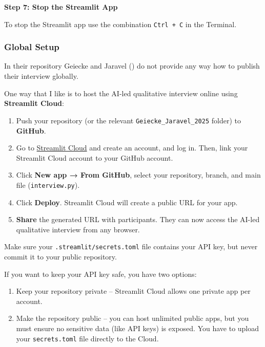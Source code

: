 \documentclass[
  letterpaper,
  DIV=11,
  numbers=noendperiod]{scrartcl}
\begin{document}
\textbf{Step 7: Stop the Streamlit App}

To stop the Streamlit app use the combination \texttt{Ctrl\ +\ C} in the
Terminal.

\subsubsection{Global Setup}\label{sec-replication-geiecke-global}

In their repository Geiecke and Jaravel
() do not provide any way how
to publish their interview globally.

One way that I like is to host the AI-led qualitative interview online
using \textbf{Streamlit Cloud}:

\begin{enumerate}
\def\labelenumi{\arabic{enumi}.}
\item
  Push your repository (or the relevant \texttt{Geiecke\_Jaravel\_2025}
  folder) to \textbf{GitHub}.
\item
  Go to \href{https://streamlit.io/cloud}{Streamlit Cloud} and create an
  account, and log in. Then, link your Streamlit Cloud account to your
  GitHub account.
\item
  Click \textbf{New app → From GitHub}, select your repository, branch,
  and main file (\texttt{interview.py}).
\item
  Click \textbf{Deploy}. Streamlit Cloud will create a public URL for
  your app.
\item
  \textbf{Share} the generated URL with participants. They can now
  access the AI-led qualitative interview from any browser.
\end{enumerate}

Make sure your \texttt{.streamlit/secrets.toml} file contains your API
key, but never commit it to your public repository.

If you want to keep your API key safe, you have two options:

\begin{enumerate}
\def\labelenumi{\arabic{enumi}.}
\item
  Keep your repository private -- Streamlit Cloud allows one private app
  per account.
\item
  Make the repository public -- you can host unlimited public apps, but
  you must ensure no sensitive data (like API keys) is exposed. You have
  to upload your \texttt{secrets.toml} file directly to the Cloud.
\end{enumerate}
\end{document}
